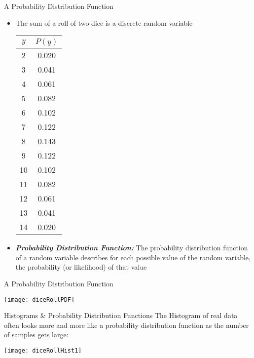 \documentclass[xcolor=dvipsnames]{beamer}
\begin{document}
\begin{frame}{A Probability Distribution Function}
	\begin{itemize}
		\item The sum of a roll of two dice is a discrete random variable 
		\vspace{10pt}
		{ \tiny
			\begin{center}
				\begin{tabular}{|c|c|} \hline
					$y $ & $P(y)$  \\ \hline \hline
					2 &   0.020 \\ \hline
					3  &   0.041\\ \hline
					4  &   0.061\\ \hline
					5  &  0.082\\ \hline
					6  &  0.102\\ \hline
					7  &  0.122\\ \hline
					8  & 0.143 \\ \hline
					9  &   0.122\\ \hline
					10  & 0.102\\ \hline
					11  & 0.082\\ \hline
					12  & 0.061 \\ \hline
					13  &  0.041 \\ \hline
					14  & 0.020\\ \hline
				\end{tabular}
		\end{center}} \pause
	\vspace{10pt}
		\item \emph{\textbf{Probability Distribution Function:}} The probability distribution function of a random variable describes for each possible value of the random variable, the probability (or likelihood) of that value
	\end{itemize}
\end{frame}

\begin{frame}{A Probability Distribution Function}
	\begin{center}
		\texttt{[image: diceRollPDF]}
	\end{center}
\end{frame}

\begin{frame}{Histograms \& Probability Distribution Functions}
	The Histogram of real data often looks more and more like a probability distribution function as the number of samples gets large:
	\begin{center}
		\texttt{[image: diceRollHist1]}
	\end{center}
\end{frame}
\end{document}

